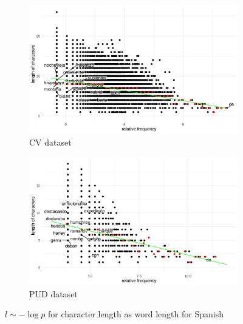 \begin{figure}[H]
  \centering
  \begin{subfigure}[b]{0.48\textwidth}
    \centering
    \includegraphics[width=\textwidth]{plots/Spanish_logp_cl_CV.pdf}
    \caption{CV dataset}
  \end{subfigure}
  \hfill
  \begin{subfigure}[b]{0.48\textwidth}
    \centering
    \includegraphics[width=\textwidth]{plots/Spanish_logp_cl_PUD.pdf}
    \caption{PUD dataset}
  \end{subfigure}
  \caption{$l \sim -\log p$ for character length as word length for Spanish}
\end{figure}

